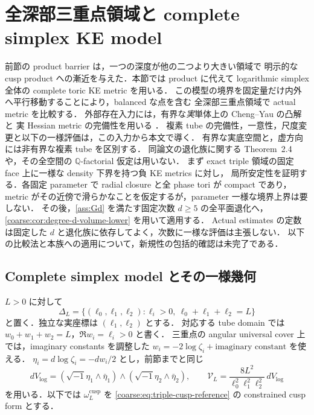 \section{全深部三重点領域と complete simplex KE model}
\label{coarse:sec:full-triple-comparison}

前節の product barrier は，一つの深度が他の二つより大きい領域で
明示的な cusp product への漸近を与えた．本節では product に代えて
logarithmic simplex 全体の complete toric KE metric を用いる．
この模型の境界を固定量だけ内外へ平行移動することにより，balanced な点を含む
全深部三重点領域で actual metric を比較する．
外部存在入力には，有界な\emph{実}単体上の Cheng--Yau の凸解と
実 Hessian metric の完備性を用いる
\cite[Theorem~2.1]{ZhangNegativeKE}．
複素 tube の完備性，一意性，尺度変更と以下の一様評価は，この入力から本文で導く．
有界な実底空間と，虚方向には非有界な複素 tube を区別する．
同論文の退化族に関する Theorem~2.4 や，その全空間の
$\mathbb Q$-factorial 仮定は用いない．
まず exact triple 領域の固定 face 上に一様な density 下界を持つ負 KE metrics に対し，
局所安定性を証明する．各固定 parameter で radial closure と全 phase tori が compact であり，
metric がその近傍で滑らかなことを仮定するが，parameter 一様な境界上界は要しない．
その後，\cref{ass:Gd} を満たす固定次数 $d\ge5$ の全平面退化へ，
\cref{coarse:cor:degree-d-volume-lower} を用いて適用する．
Actual estimates の定数は固定した $d$ と退化族に依存してよく，次数に一様な評価は主張しない．
以下の比較法と本族への適用について，新規性の包括的確認は未完了である．

\subsection{Complete simplex model とその一様幾何}

$L>0$ に対して
\[
 \Delta_L=\{(\ell_0,\ell_1,\ell_2):
              \ell_i>0,\ \ell_0+\ell_1+\ell_2=L\}
\]
と置く．独立な実座標は $(\ell_1,\ell_2)$ とする．
対応する tube domain では $w_0+w_1+w_2=L$，$\Re w_i=\ell_i>0$ と書く．
三重点の angular universal cover 上では，imaginary constants を調整した
$w_i=-2\log\zeta_i+\text{imaginary constant}$ を使える．
$\eta_i=d\log\zeta_i=-dw_i/2$ とし，前節までと同じ
\[
 dV_{\log}
  =(\sqrt{-1}\eta_1\wedge\bar\eta_1)
    \wedge(\sqrt{-1}\eta_2\wedge\bar\eta_2),
 \qquad
 \mathcal V_L=\frac{8L^2}{\ell_0^2\ell_1^2\ell_2^2}\,dV_{\log}
\]
を用いる．以下では $\omega_L^{\mathrm{cusp}}$ を
\eqref{coarse:eq:triple-cusp-reference} の constrained cusp form とする．

